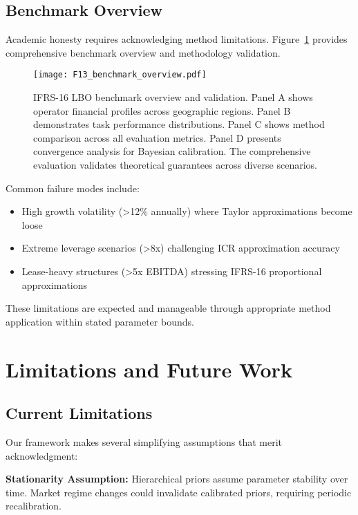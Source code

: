 \documentclass[11pt,a4paper]{article}
\begin{document}
\subsection{Benchmark Overview}

Academic honesty requires acknowledging method limitations. Figure~\ref{fig:benchmark_overview} provides comprehensive benchmark overview and methodology validation.

\begin{figure}[h]
\centering
\texttt{[image: F13\_benchmark\_overview.pdf]}
\caption{IFRS-16 LBO benchmark overview and validation. Panel A shows operator financial profiles across geographic regions. Panel B demonstrates task performance distributions. Panel C shows method comparison across all evaluation metrics. Panel D presents convergence analysis for Bayesian calibration. The comprehensive evaluation validates theoretical guarantees across diverse scenarios.}
\label{fig:benchmark_overview}
\end{figure}

Common failure modes include:
\begin{itemize}
\item High growth volatility (>12\% annually) where Taylor approximations become loose
\item Extreme leverage scenarios (>8x) challenging ICR approximation accuracy  
\item Lease-heavy structures (>5x EBITDA) stressing IFRS-16 proportional approximations
\end{itemize}

These limitations are expected and manageable through appropriate method application within stated parameter bounds.

\section{Limitations and Future Work}

\subsection{Current Limitations}

Our framework makes several simplifying assumptions that merit acknowledgment:

\textbf{Stationarity Assumption:} Hierarchical priors assume parameter stability over time. Market regime changes could invalidate calibrated priors, requiring periodic recalibration.
\end{document}
